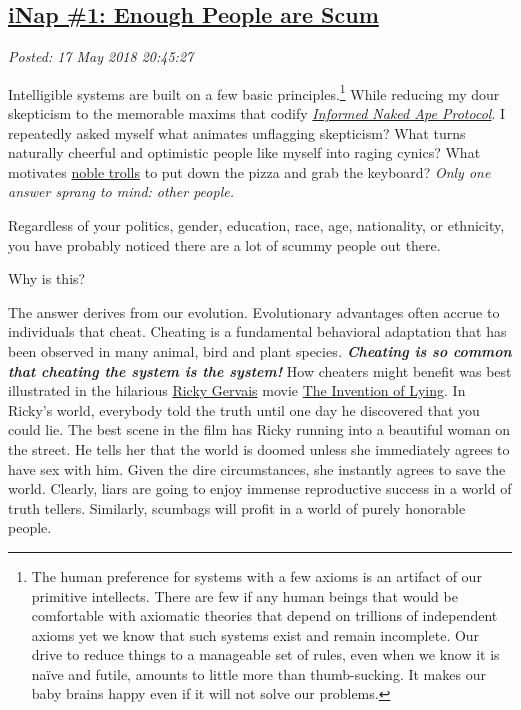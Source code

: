 %

\subsection*{\href{https://analyzethedatanotthedrivel.org/2018/05/17/inap-1-enough-people-are-scum/}{iNap \#1: Enough People are Scum}}


\noindent\emph{Posted: 17 May 2018 20:45:27}
\vspace{6pt}

Intelligible systems are built on a few basic
principles.\footnote{The human preference for systems with a few axioms is an artifact of
  our primitive intellects. There are few if any human beings that would
  be comfortable with axiomatic theories that depend on trillions of
  independent axioms yet we know that such systems exist and remain
  incomplete. Our drive to reduce things to a manageable set of rules,
  even when we know it is naïve and futile, amounts to little more than
  thumb-sucking. It makes our baby brains happy even if it will not
  solve our problems.
} While reducing
my dour skepticism to the memorable maxims that codify
\href{https://analyzethedatanotthedrivel.org/2018/05/08/informed-naked-ape-protocol/}{\emph{Informed
Naked Ape Protocol}}. I repeatedly asked myself what animates unflagging
skepticism? What turns naturally cheerful and optimistic people like
myself into raging cynics? What motivates
\href{https://www.lifewire.com/types-of-internet-trolls-3485894}{noble
trolls} to put down the pizza and grab the keyboard? \emph{Only one
answer sprang to mind: other people.}

Regardless of your politics, gender, education, race, age, nationality,
or ethnicity, you have probably noticed there are a lot of scummy people
out there.

Why is this?

The answer derives from our evolution. Evolutionary advantages often
accrue to individuals that cheat. Cheating is a fundamental behavioral
adaptation that has been observed in many animal, bird and plant
species\emph{. \textbf{Cheating is so common that cheating the system is
the system!}} How cheaters might benefit was best illustrated in the
hilarious
\href{https://www.imdb.com/name/nm0315041/?ref_=tt_ov_dr}{Ricky Gervais}
movie \href{https://www.imdb.com/title/tt1058017/}{The Invention of
Lying}. In Ricky's world, everybody told the truth until one day he
discovered that you could lie. The best scene in the film has Ricky
running into a beautiful woman on the street. He tells her that the
world is doomed unless she immediately agrees to have sex with him.
Given the dire circumstances, she instantly agrees to save the world.
Clearly, liars are going to enjoy immense reproductive success in a
world of truth tellers. Similarly, scumbags will profit in a world of
purely honorable people.

